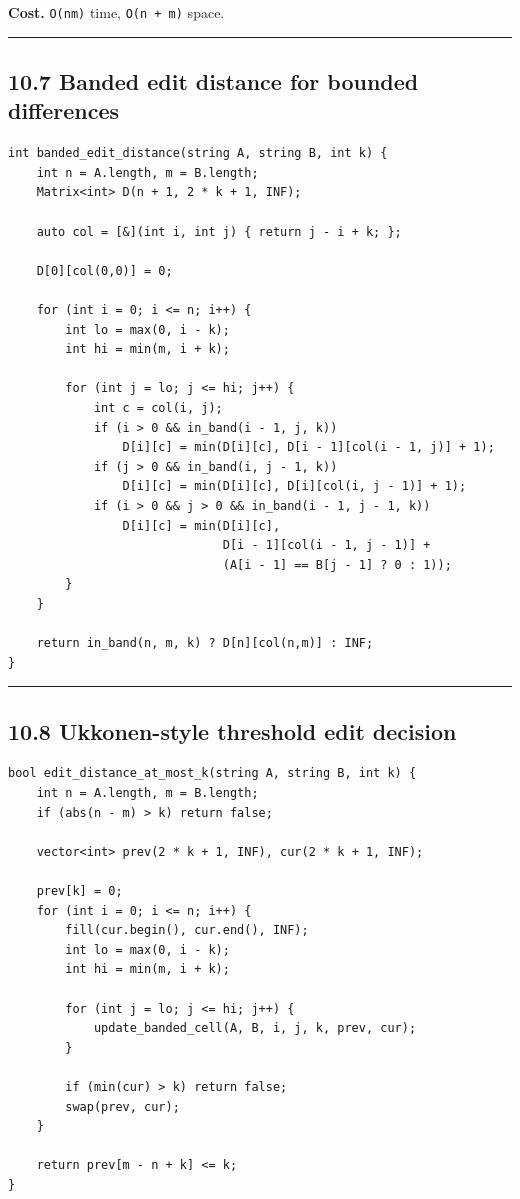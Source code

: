 \documentclass[11pt]{article}
\begin{document}
\textbf{Cost.} \texttt{O(nm)} time, \texttt{O(n + m)} space.

\begin{center}\rule{0.5\linewidth}{0.5pt}\end{center}

\subsection{10.7 Banded edit distance for bounded differences}\label{banded-edit-distance-for-bounded-differences}

\begin{verbatim}
int banded_edit_distance(string A, string B, int k) {
    int n = A.length, m = B.length;
    Matrix<int> D(n + 1, 2 * k + 1, INF);

    auto col = [&](int i, int j) { return j - i + k; };

    D[0][col(0,0)] = 0;

    for (int i = 0; i <= n; i++) {
        int lo = max(0, i - k);
        int hi = min(m, i + k);

        for (int j = lo; j <= hi; j++) {
            int c = col(i, j);
            if (i > 0 && in_band(i - 1, j, k))
                D[i][c] = min(D[i][c], D[i - 1][col(i - 1, j)] + 1);
            if (j > 0 && in_band(i, j - 1, k))
                D[i][c] = min(D[i][c], D[i][col(i, j - 1)] + 1);
            if (i > 0 && j > 0 && in_band(i - 1, j - 1, k))
                D[i][c] = min(D[i][c],
                              D[i - 1][col(i - 1, j - 1)] +
                              (A[i - 1] == B[j - 1] ? 0 : 1));
        }
    }

    return in_band(n, m, k) ? D[n][col(n,m)] : INF;
}
\end{verbatim}

\begin{center}\rule{0.5\linewidth}{0.5pt}\end{center}

\subsection{10.8 Ukkonen-style threshold edit decision}\label{ukkonen-style-threshold-edit-decision}

\begin{verbatim}
bool edit_distance_at_most_k(string A, string B, int k) {
    int n = A.length, m = B.length;
    if (abs(n - m) > k) return false;

    vector<int> prev(2 * k + 1, INF), cur(2 * k + 1, INF);

    prev[k] = 0;
    for (int i = 0; i <= n; i++) {
        fill(cur.begin(), cur.end(), INF);
        int lo = max(0, i - k);
        int hi = min(m, i + k);

        for (int j = lo; j <= hi; j++) {
            update_banded_cell(A, B, i, j, k, prev, cur);
        }

        if (min(cur) > k) return false;
        swap(prev, cur);
    }

    return prev[m - n + k] <= k;
}
\end{verbatim}
\end{document}
